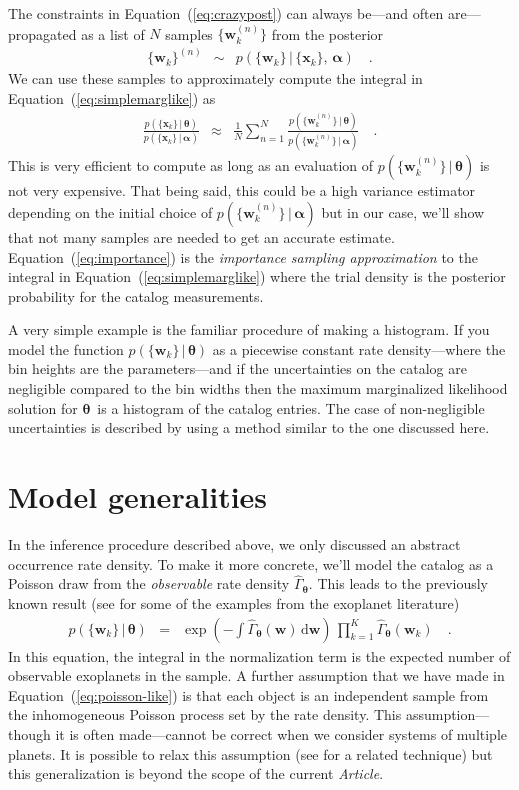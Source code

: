 \documentclass[12pt,preprint]{aastex}
\newcommand{\paper}{\textsl{Article}}
\newcommand{\Eq}[1]{Equation~(\ref{eq:#1})}
\newcommand{\eq}[1]{\Eq{#1}}
\newcommand{\eqlabel}[1]{\label{eq:#1}}
\newcommand{\sectlabel}[1]{\label{sect:#1}}
\newcommand{\dd}{\ensuremath{\,\mathrm{d}}}
\newcommand{\bvec}[1]{\ensuremath{\boldsymbol{#1}}}
\newcommand{\rate}{\ensuremath{\Gamma}}
\newcommand{\ratepar}{{\ensuremath{\theta}}}
\newcommand{\ratepars}{{\ensuremath{\bvec{\ratepar}}}}
\newcommand{\obs}[1]{\ensuremath{\hat{#1}}}
\newcommand{\data}{{\ensuremath{\bvec{x}}}}
\newcommand{\entry}{{\ensuremath{\bvec{w}}}}
\newcommand{\interim}{{\ensuremath{\bvec{\alpha}}}}
\begin{document}
The constraints in \eq{crazypost} can always be---and often are---propagated
as a list of $N$ samples $\{\entry_k^{(n)}\}$ from the posterior
\begin{eqnarray}
\{\entry_k\}^{(n)} &\sim& p(\{\entry_k\}\,|\,\{\data_k\},\,\interim) \quad.
\end{eqnarray}
We can use these samples to approximately compute the integral in
\eq{simplemarglike} as
\begin{eqnarray}\eqlabel{importance}
\frac{p(\{\data_k\}\,|\,\ratepars)}{p(\{\data_k\}\,|\,\interim)} &\approx&
    \frac{1}{N} \sum_{n=1}^N
    \frac{p(\{\entry_k^{(n)}\}\,|\,\ratepars)}
         {p(\{\entry_k^{(n)}\}\,|\,\interim)} \quad.
\end{eqnarray}
This is very efficient to compute as long as an evaluation of
$p(\{\entry_k^{(n)}\}\,|\,\ratepars)$ is not very expensive.
That being said, this could be a high variance estimator depending on the
initial choice of $p(\{\entry_k^{(n)}\}\,|\,\interim)$ but in our case, we'll
show that not many samples are needed to get an accurate estimate.
\Eq{importance} is the \emph{importance sampling approximation} to the
integral in \eq{simplemarglike} where the trial density is the posterior
probability for the catalog measurements.

A very simple example is the familiar procedure of making a histogram.
If you model the function $p(\{\entry_k\}\,|\,\ratepars)$ as a piecewise
constant rate density---where the bin heights are the parameters---and if the
uncertainties on the catalog are negligible compared to the bin widths then
the maximum marginalized likelihood solution for \ratepars\ is a histogram of
the catalog entries.
The case of non-negligible uncertainties is described by \citet{hogge} using a
method similar to the one discussed here.

\section{Model generalities}
\sectlabel{model}

In the inference procedure described above, we only discussed an abstract
occurrence rate density.
To make it more concrete, we'll model the catalog as a Poisson draw from the
\emph{observable} rate density $\obs{\rate}_\ratepars$.
This leads to the previously known result (see \citealt{tabachnik,youdin} for
some of the examples from the exoplanet literature)
\begin{eqnarray}\eqlabel{poisson-like}
p(\{\entry_k\}\,|\,\ratepars) &=&
    \exp\left(-\int \obs{\rate}_\ratepars (\entry) \dd\entry\right) \,
    \prod_{k=1}^K \obs{\rate}_\ratepars (\entry_k)\quad.
\end{eqnarray}
In this equation, the integral in the normalization term is the expected
number of observable exoplanets in the sample.
A further assumption that we have made in \eq{poisson-like} is that each
object is an independent sample from the inhomogeneous Poisson process set by
the rate density.
This assumption---though it is often made---cannot be correct when we consider
systems of multiple planets.
It is possible to relax this assumption (see \citealt{tremaine} for a related
technique) but this generalization is beyond the scope of the current \paper.
\end{document}
